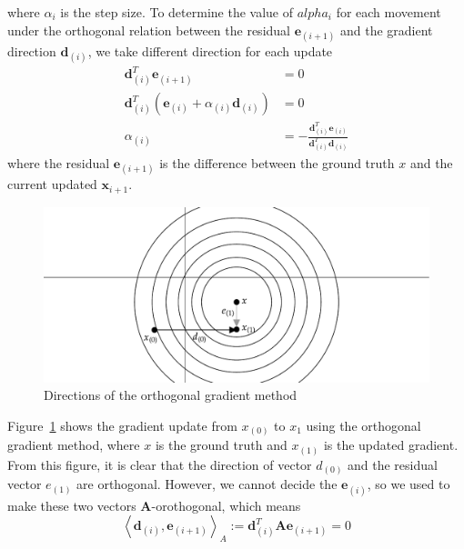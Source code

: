 where $\alpha_i$ is the step size. To determine the value of $alpha_i$ for each movement under the orthogonal relation between the residual $\mathbf{e}_{(i+1)}$ and the gradient direction $\mathbf{d}_{(i)}$, we take different direction for each update
\begin{equation}
    \begin{aligned} 
        \mathbf{d}_{(i)}^{T} \mathbf{e}_{(i+1)} &=0 \\ \mathbf{d}_{(i)}^{T}\left(\mathbf{e}_{(i)}+\alpha_{(i)} \mathbf{d}_{(i)}\right) &=0 \\ \alpha_{(i)} &=-\frac{\mathbf{d}_{(i)}^{T} \mathbf{e}_{(i)}}{\mathbf{d}_{(i)}^{T} \mathbf{d}_{(i)}} 
    \end{aligned}
\end{equation}
where the residual $\mathbf{e}_{(i+1)}$ is the difference between the ground truth $x$ and the current updated $\mathbf{x}_{i+1}$. 
\begin{figure}[t]
    \label{fig:ortho-gradient}
    \centering
    \includegraphics[page=1, width=.8\textwidth]{figs/orthogonal-gradient.pdf}
    \caption{Directions of the orthogonal gradient method}
\end{figure}
\par Figure~\ref{fig:ortho-gradient} shows the gradient update from $x_{(0)}$ to $x_{1}$ using the orthogonal gradient method, where $x$ is the ground truth and $x_{(1)}$ is the updated gradient. From this figure, it is clear that the direction of vector $d_{(0)}$ and the residual vector $e_{(1)}$ are orthogonal. However, we cannot decide the $\mathbf{e}_{(i)}$, so we used to make these two vectors $\mathbf{A}$-orothogonal, which means
\begin{equation}
    \label{equ:a-otho}
    \left\langle\mathbf{d}_{(i)}, \mathbf{e}_{(i+1)}\right\rangle_{A}:=\mathbf{d}_{(i)}^{T} \mathbf{A} \mathbf{e}_{(i+1)}=0
\end{equation}
